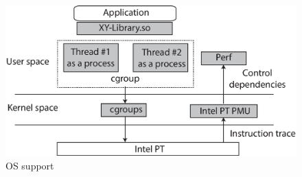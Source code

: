 
\begin{figure}[t]

\centering
      \includegraphics[scale=.35]{figure/PT-os}
  \caption{\projecttitle OS support}
   
  \label{fig:pt-OS-support}

\end{figure}
